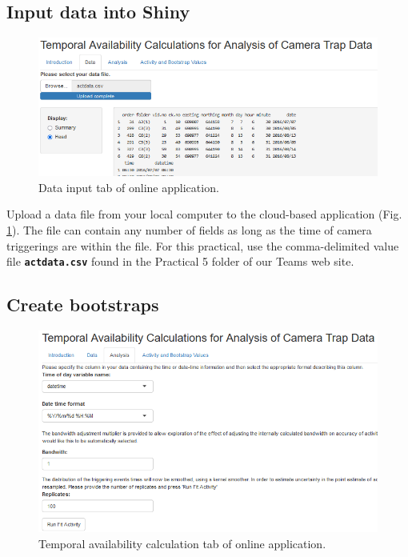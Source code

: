 \documentclass[a4paper, 10pt]{article}
\begin{document}
\subsection{Input data into Shiny}
\begin{figure}[H]
\includegraphics[width=\textwidth, frame]{images/shiny-tab2.png}
\caption{Data input tab of online application. \label{fig:sh2}}
\end{figure}

Upload a data file from your local computer to the cloud-based application (Fig. \ref{fig:sh2}).  The file can contain any number of fields as long as the time of camera triggerings are within the file.  For this practical, use the comma-delimited value file \textbf{\texttt{actdata.csv}} found in the Practical 5 folder of our Teams web site.

\subsection{Create bootstraps}
\begin{figure}[H]
\includegraphics[width=\textwidth, frame]{images/shiny-tab3.png}
\caption{Temporal availability calculation tab of online application. \label{fig:sh3}}
\end{figure}
\end{document}
